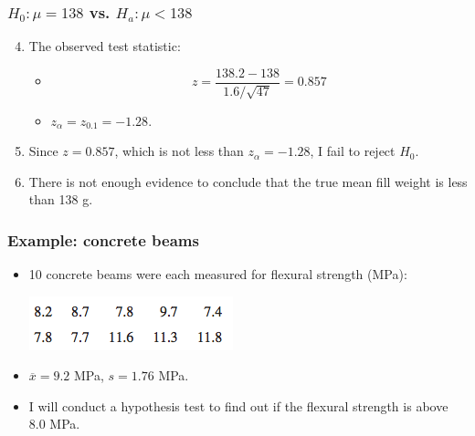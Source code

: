 \documentclass[handout]{beamer}\usepackage[]{graphicx}\usepackage[]{color}
\providecommand{\ov}[1]{\overline{#1}}
\numberwithin{equation}{section}
\begin{document}
\begin{frame}
\frametitle{ $H_0: \mu = 138$ vs. $H_a: \mu < 138$} \small
\begin{enumerate}
\setcounter{enumi}{3}
\item The observed test statistic:
\begin{itemize}
\pause \item \[z = \frac{138.2 - 138}{1.6/\sqrt{47}} = 0.857\]
\pause \item $z_{\alpha} = z_{0.1} = -1.28$.
\end{itemize}
\pause \item Since $z = 0.857$, which is not less than $z_\alpha = -1.28$, I fail to reject $H_0$.
\pause \item There is not enough evidence to conclude that the true mean fill weight is less than 138 g.
\end{enumerate}
\end{frame}





\begin{frame}
\frametitle{Example: concrete beams}
\begin{itemize}
\item 10 concrete beams were each measured for flexural strength (MPa):
\pause \begin{center}
 \includegraphics{../../fig/fbeams.png}
\end{center}
\pause \item $\ov{x} = 9.2$ MPa, $s = 1.76$ MPa.
\pause \item I will conduct a hypothesis test to find out if the flexural strength is above 8.0 MPa.
\end{itemize}
\end{frame}
\end{document}
